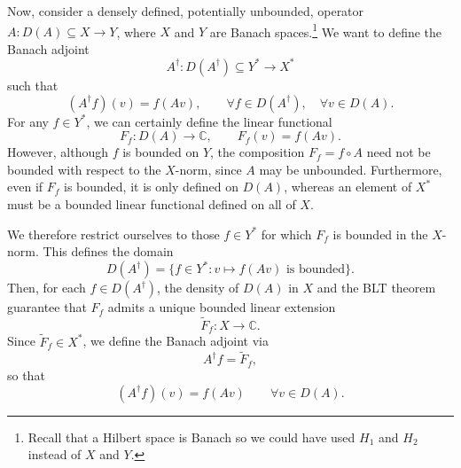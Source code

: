 \documentclass[12pt,a4paper]{article}
\theoremstyle{boldthm}
\theoremstyle{bolddefn}
\begin{document}

Now, consider a densely defined, potentially unbounded, operator
$A:D(A)\subseteq X\rightarrow Y$, where $X$ and $Y$ are Banach spaces.\footnote{Recall that a Hilbert space is Banach so we could have used $H_1$ and $H_2$ instead of $X$ and $ Y$.} 
We want to define the Banach adjoint
\[
    A^\dagger:D(A^\dagger)\subseteq Y^*\rightarrow X^*
\]
such that
\begin{equation}
    (A^\dagger f)(v)=f(Av),
    \qquad \forall f\in D(A^\dagger),\quad \forall v\in D(A).
\end{equation}
For any $f\in Y^*$, we can certainly define the linear functional
\begin{equation}
    F_f:D(A)\rightarrow\mathbb{C},
    \qquad F_f(v)=f(Av).
\end{equation}
However, although $f$ is bounded on $Y$, the composition
$F_f=f\circ A$ need not be bounded with respect to the $X$-norm,
since $A$ may be unbounded.
Furthermore, even if $F_f$ is bounded, it is only defined on $D(A)$,
whereas an element of $X^*$ must be a bounded linear functional
defined on all of $X$.

We therefore restrict ourselves to those $f\in Y^*$ for which
$F_f$ is bounded in the $X$-norm. This defines the domain
\begin{equation} \label{Domain banach}
    D(A^\dagger) = \{ f \in Y^* : v \mapsto f(Av) \text{ is bounded} \}.
\end{equation}
Then, for each $f\in D(A^\dagger)$, the density of $D(A)$ in $X$
and the BLT theorem guarantee that $F_f$ admits a unique
bounded linear extension
\begin{equation}
    \widetilde F_f:X\rightarrow\mathbb{C}.
\end{equation}
Since $\widetilde F_f\in X^*$, we define the Banach adjoint via
\begin{equation}
    A^\dagger f=\widetilde F_f,
\end{equation}
so that
\begin{equation}
    (A^\dagger f)(v)=f(Av)
    \qquad \forall v\in D(A).
\end{equation}

\end{document}
